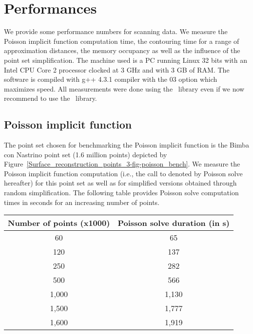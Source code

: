 \section{Performances}
\label{surface_reconstruction_section_performances}

We provide some performance numbers for scanning data. We measure the Poisson implicit function computation time, the contouring time for a range of approximation distances, the memory occupancy as well as the influence of the point set simplification. The machine used is a PC running Linux 32 bits with an Intel CPU Core 2 processor clocked at 3 GHz and with 3 GB of RAM. The software is compiled with g++ 4.3.1 compiler with the 03 option which maximizes speed.  All measurements were done using the \ccThirdPartyTaucs\ library even if we now recommend to use the \ccThirdPartyEigen\ library.

\subsection{Poisson implicit function}

The point set chosen for benchmarking the Poisson implicit function is the Bimba con Nastrino point set (1.6 million points) depicted by Figure~\ref{Surface_reconstruction_points_3-fig-poisson_bench}. We measure the Poisson implicit function computation (i.e., the call to  denoted by Poisson solve hereafter) for this point set as well as for simplified versions obtained through random simplification. The following table provides Poisson solve computation times in seconds for an increasing number of points.

\begin{tabular}{|c|c|}
  \hline
  Number of points (x1000) & Poisson solve duration (in s) \\
  \hline
  60                         & 65 \\
  120                        & 137 \\
  250                        & 282 \\
  500                        & 566 \\
  1,000                       & 1,130 \\
  1,500                       & 1,777 \\
  1,600                       & 1,919 \\
  \hline
\end{tabular}

